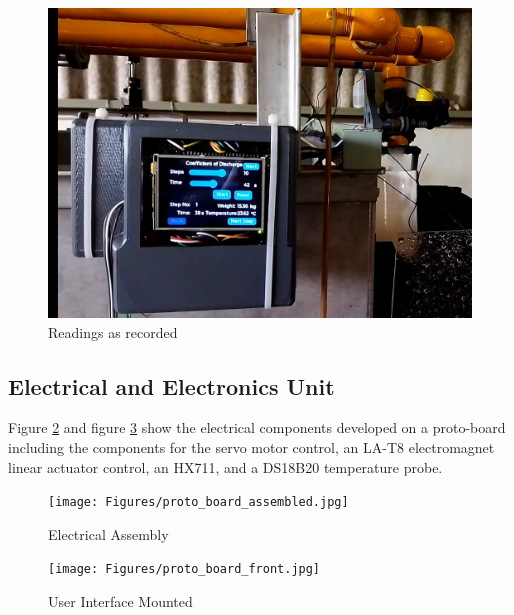 \begin{figure}[H]
            \centering
            \includegraphics[width=.85\textwidth]{Figures/vid.jpg}
            \caption{Readings as recorded}
            \label{fig: Readings as recorded}
        \end{figure}
\subsection{Electrical and Electronics Unit}
Figure \ref{fig: Electrical Assembly} and figure \ref{fig: User Interface Mounted} show the electrical components developed on a proto-board including the components for the servo motor control, an LA-T8 electromagnet linear actuator control, an HX711, and a DS18B20 temperature probe. 
\begin{figure}[H]
\centering
\texttt{[image: Figures/proto\_board\_assembled.jpg]}
\caption{Electrical Assembly}
\label{fig: Electrical Assembly}
\end{figure}
        
\begin{figure}[H]
\centering
\texttt{[image: Figures/proto\_board\_front.jpg]}
\caption{User Interface Mounted}
\label{fig: User Interface Mounted}
\end{figure}
